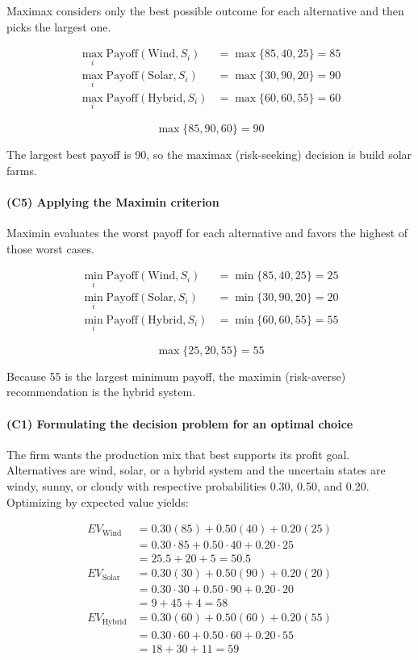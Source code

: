 Maximax considers only the best possible outcome for each alternative and then picks the largest one.

\[
\begin{aligned}
\max_i \text{Payoff}(\text{Wind}, S_i) &= \max\{85, 40, 25\} = 85\\
\max_i \text{Payoff}(\text{Solar}, S_i) &= \max\{30, 90, 20\} = 90\\
\max_i \text{Payoff}(\text{Hybrid}, S_i) &= \max\{60, 60, 55\} = 60
\end{aligned}
\]

\[
\max\{85, 90, 60\} = 90
\]

The largest best payoff is 90, so the maximax (risk-seeking) decision is build solar farms.

\paragraph{(C5) Applying the Maximin criterion}\label{subsubsec:practice-activity-1-solution-2-c5}

Maximin evaluates the worst payoff for each alternative and favors the highest of those worst cases.

\[
\begin{aligned}
\min_i \text{Payoff}(\text{Wind}, S_i) &= \min\{85, 40, 25\} = 25\\
\min_i \text{Payoff}(\text{Solar}, S_i) &= \min\{30, 90, 20\} = 20\\
\min_i \text{Payoff}(\text{Hybrid}, S_i) &= \min\{60, 60, 55\} = 55
\end{aligned}
\]

\[
\max\{25, 20, 55\} = 55
\]

Because 55 is the largest minimum payoff, the maximin (risk-averse) recommendation is the hybrid system.

\paragraph{(C1) Formulating the decision problem for an optimal choice}\label{subsubsec:practice-activity-1-solution-2-c1}

The firm wants the production mix that best supports its profit goal. Alternatives are wind,
solar, or a hybrid system and the uncertain states are windy,
sunny, or cloudy with respective probabilities 0.30, 0.50, and 0.20. Optimizing
by expected value yields:

\[
\begin{aligned}
EV_{\text{Wind}} &= 0.30(85) + 0.50(40) + 0.20(25) \\
&= 0.30\cdot85 + 0.50\cdot40 + 0.20\cdot25 \\
&= 25.5 + 20 + 5 = 50.5 \\
EV_{\text{Solar}} &= 0.30(30) + 0.50(90) + 0.20(20) \\
&= 0.30\cdot30 + 0.50\cdot90 + 0.20\cdot20 \\
&= 9 + 45 + 4 = 58 \\
EV_{\text{Hybrid}} &= 0.30(60) + 0.50(60) + 0.20(55) \\
&= 0.30\cdot60 + 0.50\cdot60 + 0.20\cdot55 \\
&= 18 + 30 + 11 = 59
\end{aligned}
\]

